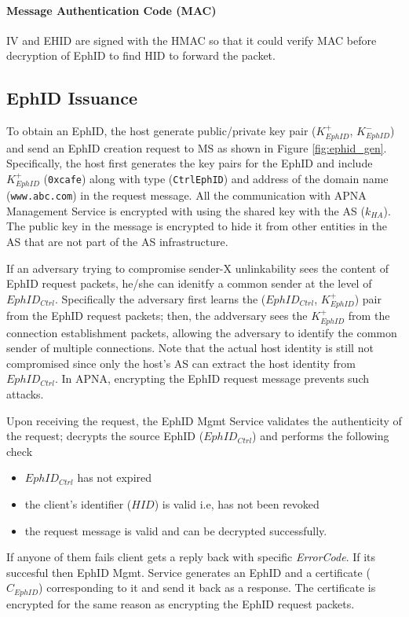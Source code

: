 \paragraph{Message Authentication Code (MAC)}
IV and EHID are signed with the HMAC so that it could verify MAC before decryption of EphID to find HID to forward the packet.

\subsection{EphID Issuance} \label{sec:why_encrypt}
To obtain an EphID, the host generate public/private key pair ($K^{+}_{EphID}$, $K^{-}_{EphID}$) and send an EphID creation request to MS as shown in Figure \ref{fig:ephid_gen}. Specifically, the host first generates the key pairs for the EphID and include $K^{+}_{EphID}$ (\texttt{0xcafe}) along with type (\texttt{CtrlEphID}) and address of the domain name (\texttt{www.abc.com}) in the request message. All the communication with APNA Management Service is encrypted with using the shared key with the AS ($k_{HA}$). The public key in the message is encrypted to hide it from other entities in the AS that are not part of the AS infrastructure.

If an adversary trying to compromise sender-X unlinkability sees the content of EphID request packets, he/she can idenitfy a common sender at the level of $EphID_{Ctrl}$. Specifically the adversary first learns the ($EphID_{Ctrl}$, $K^{+}_{EphID}$) pair from the EphID request packets; then, the addversary sees the $K^{+}_{EphID}$ from the connection establishment packets, allowing the adversary to identify the common sender of multiple connections. Note that the actual host identity is still not compromised since only the host's AS can extract the host identity from $EphID_{Ctrl}$. In APNA, encrypting the EphID request message prevents such attacks.

Upon receiving the request, the EphID Mgmt Service validates the authenticity of the request; decrypts the source EphID ($EphID_{Ctrl}$) and performs the following check
\begin{itemize}
    \item $EphID_{Ctrl}$ has not expired
    \item the client's identifier ($HID$) is valid i.e, has not been revoked
    \item the request message is valid and can be decrypted successfully.
\end{itemize}
If anyone of them fails client gets a reply back with specific \textit{ErrorCode}. If its succesful then EphID Mgmt. Service generates an EphID and a certificate ($C_{EphID}$) corresponding to it and send it back as a response. The certificate is encrypted for the same reason as encrypting the EphID request packets.

